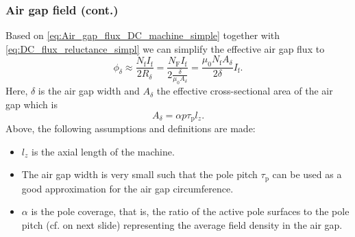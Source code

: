 \begin{frame}
	\frametitle{Air gap field (cont.)}
	Based on \eqref{eq:Air_gap_flux_DC_machine_simple} together with \eqref{eq:DC_flux_reluctance_simpl} we can simplify the effective air gap flux to
	\begin{equation}
		\phi_\delta \approx \frac{N_\mathrm{f} I_\mathrm{f}}{2 R_\delta} = \frac{N_\mathrm{F} I_\mathrm{f}}{2 \frac{\delta}{\mu_0 A_\delta}} = \frac{\mu_0 N_\mathrm{f} A_\delta}{2 \delta} I_\mathrm{f}.
		\label{eq:Air_gap_flux_DC_machine}
	\end{equation}\pause
	Here, $\delta$ is the air gap width and $A_\delta$ the effective cross-sectional area of the air gap which is
	\begin{equation}
		A_\delta = \alpha p \tau_\mathrm{p} l_z .
		\label{eq:Air_gap_area_DC_machine}
	\end{equation}\pause
	Above, the following assumptions and definitions are made:
	\begin{itemize}
		\item $l_z$ is the axial length of the machine. \pause
		\item The air gap width is very small such that the pole pitch $\tau_\mathrm{p}$ can be used as a good approximation for the air gap  circumference. \pause
		\item $\alpha$ is the pole coverage, that is, the ratio of the active pole surfaces to the pole pitch (cf.  on next slide) representing the average field density in the air gap.
	\end{itemize}
\end{frame}

